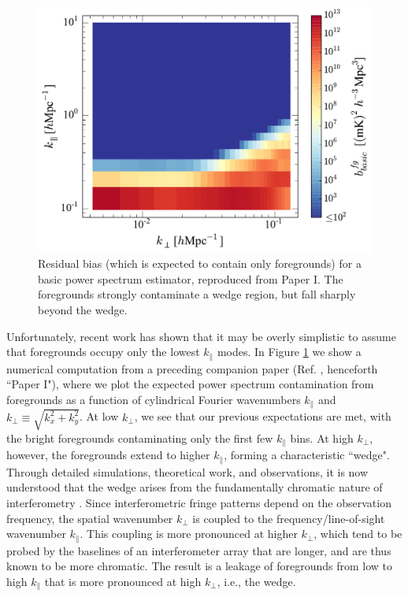 \documentclass[twocolumn,aps,prd,nofootinbib,showpacs]{revtex4-1}
\begin{document}
\begin{figure}[!ht] 
	\centering 
	\includegraphics[width=.49\textwidth]{figures/simpleEstBias.pdf}
	\caption{Residual bias (which is expected to contain only foregrounds) for a basic power spectrum estimator, reproduced from Paper I.  The foregrounds strongly contaminate a wedge region, but fall sharply beyond the wedge.}
	\label{fig:basicEstBias}
\end{figure} 

Unfortunately, recent work has shown that it may be overly simplistic to assume that foregrounds occupy only the lowest $k_\parallel$ modes.  In Figure \ref{fig:basicEstBias} we show a numerical computation from a preceding companion paper (Ref. \cite{Liu2014a}, henceforth ``Paper I"), where we plot the expected power spectrum contamination from foregrounds as a function of cylindrical Fourier wavenumbers $k_\parallel$ and $k_\perp \equiv \sqrt{k_x^2 + k_y^2}$.  At low $k_\perp$, we see that our previous expectations are met, with the bright foregrounds contaminating only the first few $k_\parallel$ bins.  At high $k_\perp$, however, the foregrounds extend to higher $k_\parallel$, forming a characteristic ``wedge".  Through detailed simulations, theoretical work, and observations, it is now understood that the wedge arises from the fundamentally chromatic nature of interferometry \cite{Datta2010,Vedantham2012,Parsons2012b,Morales2012,Trott2012,Thyagarajan2013,Hazelton2013,Pober2013b,Dillon2014}.  Since interferometric fringe patterns depend on the observation frequency, the spatial wavenumber $k_\perp$ is coupled to the frequency/line-of-sight wavenumber $k_\parallel$.  This coupling is more pronounced at higher $k_\perp$, which tend to be probed by the baselines of an interferometer array that are longer, and are thus known to be more chromatic.  The result is a leakage of foregrounds from low to high $k_\parallel$ that is more pronounced at high $k_\perp$, i.e., the wedge.
\end{document}
